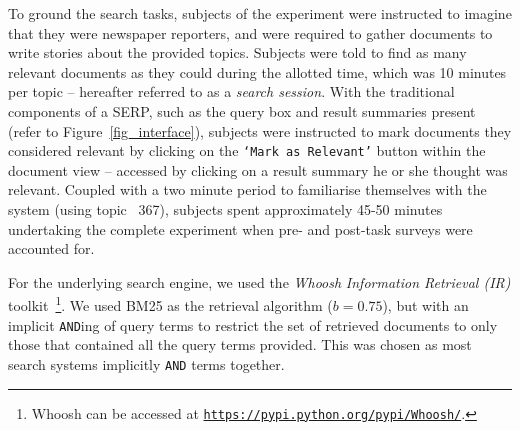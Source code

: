 %

To ground the search tasks, subjects of the experiment were instructed to imagine that they were newspaper reporters, and were required to gather documents to write stories about the provided topics. Subjects were told to find as many relevant documents as they could during the allotted time, which was 10 minutes per topic -- hereafter referred to as a \emph{search session}. With the traditional components of a SERP, such as the query box and result summaries present (refer to Figure~\ref{fig_interface}), subjects were instructed to mark documents they considered relevant by clicking on the \texttt{`Mark as Relevant'} button within the document view -- accessed by clicking on a result summary he or she thought was relevant. Coupled with a two minute period to familiarise themselves with the system (using topic \textnumero~367), subjects spent approximately 45-50 minutes undertaking the complete experiment when pre- and post-task surveys were accounted for. 

For the underlying search engine, we used the \emph{Whoosh} \emph{Information Retrieval (IR)} toolkit~\footnote{Whoosh can be accessed at \texttt{\url{https://pypi.python.org/pypi/Whoosh/}}.}. We used BM25 as the retrieval algorithm ($b=0.75$), but with an implicit \texttt{AND}ing of query terms to restrict the set of retrieved documents to only those that contained all the query terms provided. This was chosen as most search systems implicitly \texttt{AND} terms together. 

